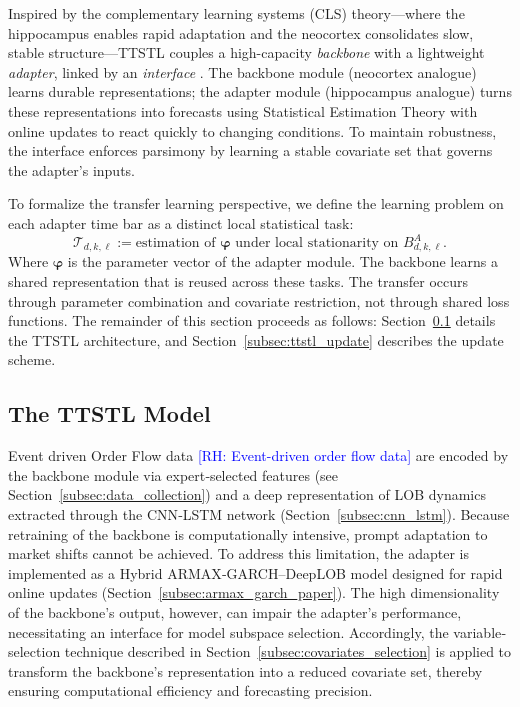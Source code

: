 \documentclass[10pt,a4paper,oneside]{article}
\newcommand{\rh}[1]{\textcolor{blue}{\textsf{[RH: #1]}}}
\begin{document}
Inspired by the complementary learning systems (CLS) theory—where the hippocampus enables rapid adaptation and the neocortex consolidates slow, stable structure—TTSTL couples a high-capacity \emph{backbone} with a lightweight \emph{adapter}, linked by an \emph{interface} \cite{pham_continual_2024}. The backbone module (neocortex analogue) learns durable representations; the adapter module (hippocampus analogue) turns these representations into forecasts using Statistical Estimation Theory with online updates to react quickly to changing conditions. To maintain robustness, the interface enforces parsimony by learning a stable covariate set that governs the adapter’s inputs.

To formalize the transfer learning perspective, we define the learning problem on each adapter time bar as a distinct local statistical task:
\[
\mathcal{T}_{d,k,\ell} := \text{estimation of } \boldsymbol{\varphi} \text{ under local stationarity on } B^A_{d,k,\ell}.
\]
Where $\boldsymbol{\varphi}$ is the parameter vector of the adapter module. The backbone learns a shared representation that is reused across these tasks. The transfer occurs through parameter combination and covariate restriction, not through shared loss functions. The remainder of this section proceeds as follows: Section~\ref{subsec:ttstl_model} details the TTSTL architecture, and Section~\ref{subsec:ttstl_update} describes the update scheme.

\subsection{The TTSTL Model}
\label{subsec:ttstl_model}

Event driven Order Flow data \rh{Event-driven order flow data} are encoded by the backbone module via expert‐selected features (see Section~\ref{subsec:data_collection}) and a deep representation of LOB dynamics extracted through the CNN‐LSTM network (Section~\ref{subsec:cnn_lstm}).  Because retraining of the backbone is computationally intensive, prompt adaptation to market shifts cannot be achieved.  To address this limitation, the adapter is implemented as a Hybrid ARMAX‐GARCH–DeepLOB model designed for rapid online updates (Section~\ref{subsec:armax_garch_paper}).  The high dimensionality of the backbone’s output, however, can impair the adapter’s performance, necessitating an interface for model subspace selection.  Accordingly, the variable‐selection technique described in Section~\ref{subsec:covariates_selection} is applied to transform the backbone’s representation into a reduced covariate set, thereby ensuring computational efficiency and forecasting precision.
\end{document}
